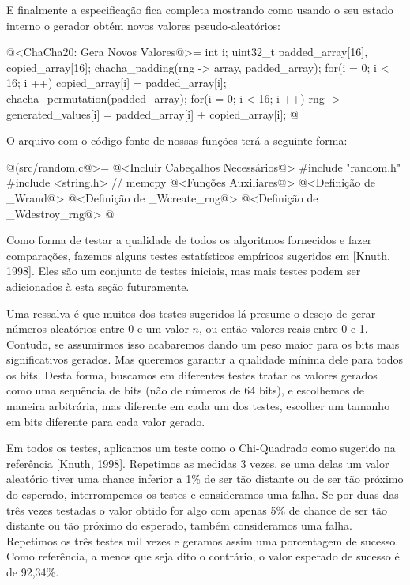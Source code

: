 E finalmente a especificação fica completa mostrando como usando o seu
estado interno o gerador obtém novos valores pseudo-aleatórios:

\iniciocodigo
@<ChaCha20: Gera Novos Valores@>=
{
  int i;
  uint32_t padded_array[16], copied_array[16];
  chacha_padding(rng -> array, padded_array);
  for(i = 0; i < 16; i ++)
    copied_array[i] = padded_array[i];
  chacha_permutation(padded_array);
  for(i = 0; i < 16; i ++)
    rng -> generated_values[i] = padded_array[i] + copied_array[i];
}
@
\fimcodigo


O arquivo com o código-fonte de nossas funções terá a seguinte forma:


\iniciocodigo
@(src/random.c@>=
@<Incluir Cabeçalhos Necessários@>
#include "random.h"
#include <string.h> // memcpy
@<Funções Auxiliares@>
@<Definição de \_Wrand@>
@<Definição de \_Wcreate\_rng@>
@<Definição de \_Wdestroy\_rng@>
@
\fimcodigo


Como forma de testar a qualidade de todos os algoritmos fornecidos e
fazer comparações, fazemos alguns testes estatísticos empíricos
sugeridos em [Knuth, 1998]. Eles são um conjunto de testes iniciais,
mas mais testes podem ser adicionados à esta seção futuramente.

Uma ressalva é que muitos dos testes sugeridos lá presume o desejo de
gerar números aleatórios entre 0 e um valor $n$, ou então valores
reais entre 0 e 1. Contudo, se assumirmos isso acabaremos dando um
peso maior para os bits mais significativos gerados. Mas queremos
garantir a qualidade mínima dele para todos os bits. Desta forma,
buscamos em diferentes testes tratar os valores gerados como uma
sequência de bits (não de números de 64 bits), e escolhemos de maneira
arbitrária, mas diferente em cada um dos testes, escolher um tamanho
em bits diferente para cada valor gerado.

Em todos os testes, aplicamos um teste como o Chi-Quadrado como
sugerido na referência [Knuth, 1998]. Repetimos as medidas 3 vezes, se
uma delas um valor aleatório tiver uma chance inferior a 1\% de ser
tão distante ou de ser tão próximo do esperado, interrompemos os
testes e consideramos uma falha. Se por duas das três vezes testadas o
valor obtido for algo com apenas 5\% de chance de ser tão distante ou
tão próximo do esperado, também consideramos uma falha. Repetimos os
três testes mil vezes e geramos assim uma porcentagem de sucesso. Como
referência, a menos que seja dito o contrário, o valor esperado de
sucesso é de 92,34\%.

